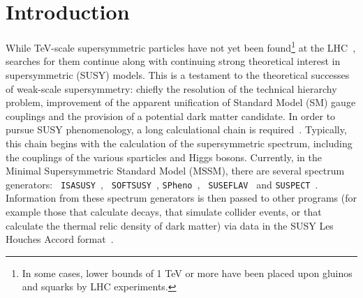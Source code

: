 \documentclass[final,3p,times,pdflatex]{elsarticle}
\begin{document}
\newpage

\section{Introduction}

While TeV-scale supersymmetric particles have not yet been found\footnote{In some
  cases, lower   bounds of 1 
TeV or more have been placed upon gluinos and squarks by LHC experiments.}
at the LHC~\cite{Aad:2013wta,CMSspart}, searches for them continue along with
continuing strong theoretical interest in supersymmetric (SUSY) models. 
This is a
testament to the 
theoretical successes of weak-scale supersymmetry: chiefly the resolution of
the technical hierarchy problem, improvement of the apparent unification of Standard
Model (SM) gauge couplings and the provision of a potential 
dark matter candidate. 
In order to pursue SUSY phenomenology, a long calculational chain is
required~\cite{Allanach:2008zn}. Typically, this chain begins with the
calculation of the 
supersymmetric spectrum, including the couplings of the various sparticles and
Higgs bosons. Currently, in the Minimal Supersymmetric Standard Model (MSSM), there
are several spectrum generators: {\tt
  ISASUSY}~\cite{Baer:1993ae}, {\tt 
  SOFTSUSY}~\cite{Allanach:2001kg}, {\tt   SPheno}~\cite{Porod:2003um}, {\tt
  SUSEFLAV}~\cite{Chowdhury:2011zr} and {\tt SUSPECT}~\cite{Djouadi:2002ze}. 
Information from these spectrum generators is then passed to other programs
(for example those that calculate decays, that simulate collider events, or
that calculate the thermal relic density of dark matter) via data in the SUSY
Les Houches Accord format~\cite{Skands:2003cj}.
\end{document}
